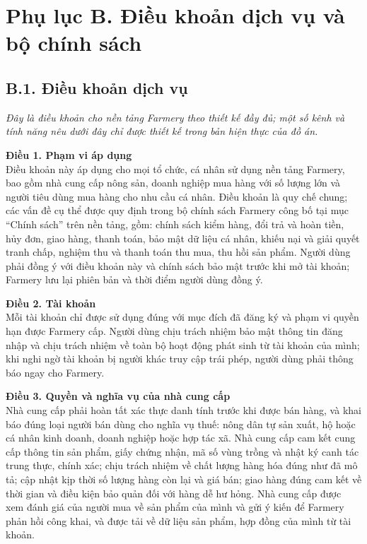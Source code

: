 
\section*{Phụ lục B. Điều khoản dịch vụ và bộ chính sách}
\label{apdx:tos}

\subsection*{B.1. Điều khoản dịch vụ}

\noindent\emph{Đây là điều khoản cho nền tảng Farmery theo thiết kế đầy đủ; một
số kênh và tính năng nêu dưới đây chỉ được thiết kế trong bản hiện thực của đồ
án.}

\noindent\textbf{Điều 1. Phạm vi áp dụng}\\
Điều khoản này áp dụng cho mọi tổ chức, cá nhân sử dụng nền tảng Farmery,
bao gồm nhà cung cấp nông sản, doanh nghiệp mua hàng với số lượng lớn và
người tiêu dùng mua hàng cho nhu cầu cá nhân. Điều khoản là quy chế chung;
các vấn đề cụ thể được quy định trong bộ chính sách Farmery công bố tại mục
``Chính sách'' trên nền tảng, gồm: chính sách kiểm hàng, đổi trả và hoàn
tiền, hủy đơn, giao hàng, thanh toán, bảo mật dữ liệu cá nhân, khiếu nại và
giải quyết tranh chấp, nghiệm thu và thanh toán thu mua, thu hồi sản phẩm.
Người dùng phải đồng ý với điều khoản này và chính sách bảo mật trước khi mở
tài khoản; Farmery lưu lại phiên bản và thời điểm người dùng đồng ý.

\noindent\textbf{Điều 2. Tài khoản}\\
Mỗi tài khoản chỉ được sử dụng đúng với mục đích đã đăng ký và phạm vi quyền
hạn được Farmery cấp. Người dùng chịu trách nhiệm bảo mật thông tin đăng
nhập và chịu trách nhiệm về toàn bộ hoạt động phát sinh từ tài khoản của
mình; khi nghi ngờ tài khoản bị người khác truy cập trái phép, người dùng
phải thông báo ngay cho Farmery.

\noindent\textbf{Điều 3. Quyền và nghĩa vụ của nhà cung cấp}\\
Nhà cung cấp phải hoàn tất xác thực danh tính trước khi được bán hàng, và
khai báo đúng loại người bán dùng cho nghĩa vụ thuế: nông dân tự sản xuất, hộ
hoặc cá nhân kinh doanh, doanh nghiệp hoặc hợp tác xã. Nhà cung cấp cam kết
cung cấp thông tin sản phẩm, giấy chứng nhận, mã số vùng trồng và nhật ký
canh tác trung thực, chính xác; chịu trách nhiệm về chất lượng hàng hóa đúng
như đã mô tả; cập nhật kịp thời số lượng hàng còn lại và giá bán; giao hàng
đúng cam kết về thời gian và điều kiện bảo quản đối với hàng dễ hư hỏng. Nhà
cung cấp được xem đánh giá của người mua về sản phẩm của mình và gửi ý kiến
để Farmery phản hồi công khai, và được tải về dữ liệu sản phẩm, hợp đồng của mình từ tài khoản.

